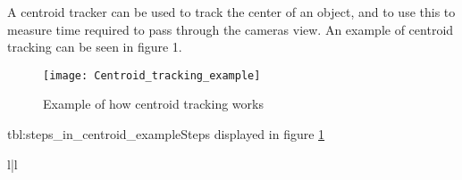 A centroid tracker can be used to track the center of an object, and to use this to measure time required to pass through the cameras view. An example 
of centroid tracking can be seen in figure 1.

\begin{figure}[h]
    \caption{Example of how centroid tracking works}
    \centering
    \texttt{[image: Centroid\_tracking\_example]}
    \label{fig:centroid_example}
\end{figure}

\begin{lintable}{tbl:steps_in_centroid_example}{Steps displayed in figure \ref{fig:centroid_example}}
    \begin{lintabular}{l|l}
    \end{lintabular}
\end{lintable}

